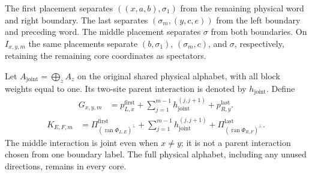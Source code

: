 \begin{definition}
    \label{def:mpo_joint_core_placements}
    \leanok
    The first placement separates $((x,a,b),\sigma_1)$ from the remaining
    physical word and right boundary. The last separates
    $(\sigma_m,(y,c,e))$ from the left boundary and preceding word.
    The middle placement separates $\sigma$ from both boundaries.
    On $I_{x,y,m}$ the same placements separate $(b,\sigma_1)$,
    $(\sigma_m,c)$, and $\sigma$, respectively, retaining the remaining
    core coordinates as spectators.
\end{definition}

\begin{definition}
    \label{def:mpo_joint_common_core_sum}
    \leanok
    Let $A_{\mathrm{joint}}=\bigoplus_z A_z$ on the original shared
    physical alphabet, with all block weights equal to one. Its two-site
    parent interaction is denoted by $h_{\mathrm{joint}}$. Define
    \begin{align}
        G_{x,y,m} & =p_{L,x}^{\mathrm{first}}+
        \sum_{j=1}^{m-1}h_{\mathrm{joint}}^{(j,j+1)}+
        p_{R,y}^{\mathrm{last}}.\label{eq:mpo_joint_core_sum}
    \end{align}
    \begin{align}
        K_{E,F,m} & =\Pi_{(\operatorname{ran}\Phi_{L,E})^\perp}^{\mathrm{first}}+
        \sum_{j=1}^{m-1}h_{\mathrm{joint}}^{(j,j+1)}+
        \Pi_{(\operatorname{ran}\Phi_{R,F})^\perp}^{\mathrm{last}}.
        \label{eq:mpo_joint_normalized_sum}
    \end{align}
    The middle interaction is joint even when $x\ne y$; it is not a
    parent interaction chosen from one boundary label. The full physical
    alphabet, including any unused directions, remains in every core.
\end{definition}

